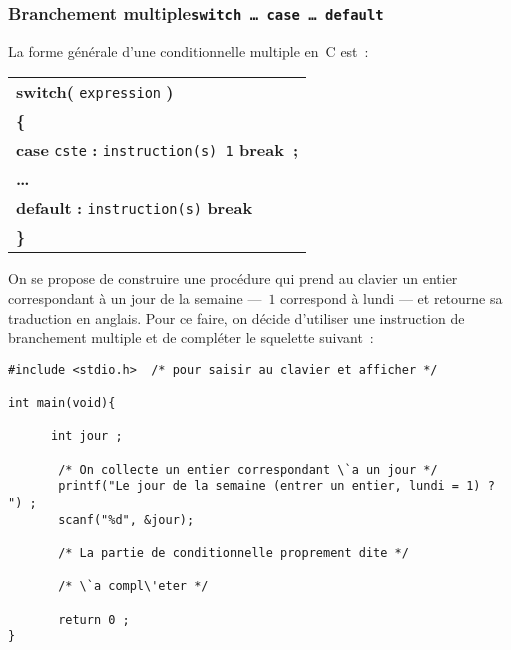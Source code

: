 \subsubsection{Branchement multiple\qquad  \texttt{switch \dots\ case \dots\ default}}
\label{sec:BranchementMultiple}
La forme g\'en\'erale d'une conditionnelle multiple en~C est~:
\par
\begin{center}
  \begin{tabular}{l}
    \textbf{switch(} \texttt{expression} \textbf{)}\\
    \index{switch}
    \textbf{\{} \\
    \qquad  \textbf{case} \texttt{cste} \textbf{:} 
    \texttt{instruction(s) 1} \textbf{break~;}\\
    \textbf{\ldots} \\
    \qquad \textbf{default} \textbf{:} \texttt{instruction(s)} 
    \index{default}
    \textbf{break} \\
    \textbf{\}}
  \end{tabular}
\end{center}
\begin{exercice}
  On se propose de construire une proc\'edure qui  prend au clavier un
  entier  correspondant \`a un  jour de  la semaine ---~$1$ correspond
  \`a lundi --- et retourne sa traduction en  anglais.  Pour ce faire,
  on d\'ecide d'utiliser une instruction de branchement multiple et de
  compl\'eter le squelette suivant~:
\begin{verbatim}
#include <stdio.h>  /* pour saisir au clavier et afficher */

int main(void){

      int jour ;

       /* On collecte un entier correspondant \`a un jour */
       printf("Le jour de la semaine (entrer un entier, lundi = 1) ? ") ;
       scanf("%d", &jour);

       /* La partie de conditionnelle proprement dite */

       /* \`a compl\'eter */

       return 0 ;
}
\end{verbatim}
  \ifcorrection
  \begin{correction}
    
  \end{correction}
  \fi
\end{exercice}
